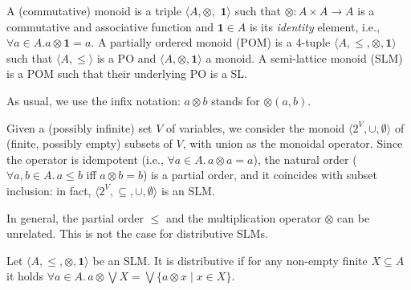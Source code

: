 \documentclass{llncs}
\def\1{{\mathbf 1}}
\newcommand{\comment}[1]{}
\def\monid{{\mathbf 0}}
\def\1{{\mathbf 1}}
\def\monop{\otimes}
\def\monid{\mathbf{1}}
\begin{document}
\begin{definition}\label{defn:clm}
	A (commutative) monoid is a triple
	$\langle A, \monop,$ $\1 \rangle$ such that $\monop: A \times A \rightarrow A$ is
	a commutative and associative function and $\1 \in A$ is its \emph{identity} element,
	i.e., $\forall a \in A. a \monop \1 = a$.
%	
	A partially ordered monoid (POM) is a 4-tuple
	$\langle A, \leq, \monop, \1 \rangle$ such that 	
	$\langle A, \leq \rangle$ is a PO and $\langle A, \monop, \1 \rangle$ a monoid.
	A semi-lattice monoid (SLM) is a 
	POM such that their underlying PO is a SL.
\end{definition}

As usual, we use the infix notation: $a \monop b$ stands for $\monop(a,b)$.
\comment{The monoidal operator can be defined for any multi-set: it is given 
for a family of elements $a_i \in A$ indexed over a non-empty finite
set $I$, and it is denoted by
$\bigotimes_{i \in I} a_i$.
%
If for an index set $I$ the $a_i$'s are different,
we write $\bigotimes S$ instead of $\bigotimes_{i \in I} a_i$
for the set $S = \{a_i \mid i \in I\}$.
%
Conventionally, we denote $\bigotimes \emptyset = \bot$.
}

\begin{example}\label{ex:powerset}
	Given a (possibly infinite) set $V$ of variables, we consider
	the monoid $\langle 2^V, \cup, \emptyset \rangle$
	of (finite, possibly empty) subsets of $V$, with union as the monoidal operator.
	Since the operator is idempotent (i.e., $\forall a\in A.\, a \monop a = a$), 
	the natural order ($\forall a, b \in A.\, a \leq b$ iff $a \monop b = b$) 
	is a partial order, and 
	it coincides with subset inclusion:
	in fact, $\langle 2^V, \subseteq, \cup, \emptyset \rangle$
	is an SLM.
\end{example}

In general, the partial order $\leq$ and the multiplication operator $\otimes$ can be unrelated.
This is not the case for distributive SLMs.

\begin{definition}[distributivity]
\label{dist}
Let $\langle A, \leq, \monop, \monid \rangle$ be an SLM.
It is distributive if
	for  any  non-empty finite  $X \subseteq A$
		it holds $\forall a \in A.\,  a \monop  \bigvee X = \bigvee \{a \monop x \mid x \in X\}$.
\end{definition}
\end{document}
